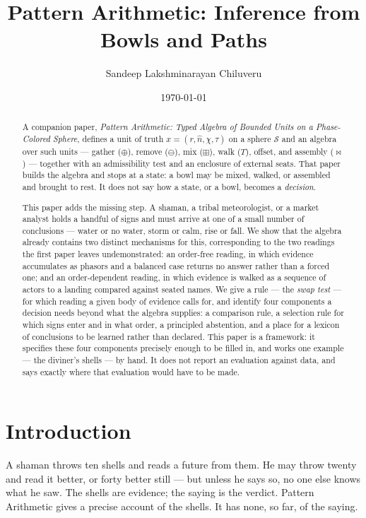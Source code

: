\documentclass[12pt, a4paper]{article}
\title{Pattern Arithmetic: Inference from Bowls and Paths}
\author{Sandeep Lakshminarayan Chiluveru}
\date{\today}
\begin{document}
\maketitle

\begin{abstract}
A companion paper, \emph{Pattern Arithmetic: Typed Algebra of Bounded
Units on a Phase-Colored Sphere}, defines a unit of truth
$x=(r,\hat n,\chi,\tau)$ on a sphere $\mathcal{S}$ and an algebra over
such units --- gather ($\oplus$), remove ($\ominus$), mix ($\boxplus$),
walk ($T$), offset, and assembly ($\bowtie$) --- together with an
admissibility test and an enclosure of external seats. That paper
builds the algebra and stops at a state: a bowl may be mixed, walked,
or assembled and brought to rest. It does not say how a
state, or a bowl, becomes a \emph{decision}.

This paper adds the missing step. A shaman, a tribal meteorologist, or
a market analyst holds a handful of signs and must arrive at one of a
small number of conclusions --- water or no water, storm or calm, rise
or fall. We show that the algebra already contains two distinct
mechanisms for this, corresponding to the two readings the first paper
leaves undemonstrated: an order-free reading, in which evidence
accumulates as phasors and a balanced case returns no answer rather
than a forced one; and an order-dependent reading, in which evidence
is walked as a sequence of actors to a landing compared against
seated names. We give a rule --- the \emph{swap test} --- for which
reading a given body of evidence calls for, and identify four
components a decision needs beyond what the algebra supplies: a
comparison rule, a selection rule for which signs enter and in what
order, a principled abstention, and a place for a lexicon of
conclusions to be learned rather than declared. This paper is a
framework: it specifies these four components precisely enough to be
filled in, and works one example --- the diviner's shells --- by hand.
It does not report an evaluation against data, and says exactly where
that evaluation would have to be made.
\end{abstract}

\section{Introduction}
\label{sec:intro}

A shaman throws ten shells and reads a future from them. He may throw
twenty and read it better, or forty better still --- but unless he
says so, no one else knows what he saw. The shells are evidence; the
saying is the verdict. Pattern Arithmetic gives a precise account of
the shells. It has none, so far, of the saying.
\end{document}

